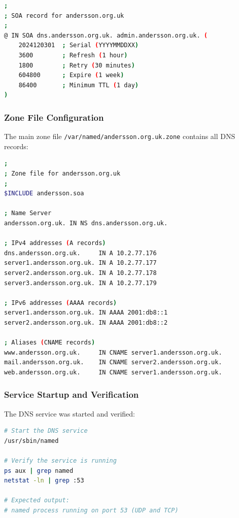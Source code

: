 \documentclass[12pt,a4paper]{article}
\begin{document}
\begin{lstlisting}[language=bash, caption=SOA Record for andersson.org.uk]
;
; SOA record for andersson.org.uk
;
@ IN SOA dns.andersson.org.uk. admin.andersson.org.uk. (
    2024120301  ; Serial (YYYYMMDDXX)
    3600        ; Refresh (1 hour)
    1800        ; Retry (30 minutes)
    604800      ; Expire (1 week)
    86400       ; Minimum TTL (1 day)
)
\end{lstlisting}

\subsubsection{Zone File Configuration}
The main zone file \texttt{/var/named/andersson.org.uk.zone} contains all DNS records:

\begin{lstlisting}[language=bash, caption=Zone File for andersson.org.uk]
;
; Zone file for andersson.org.uk
;
$INCLUDE andersson.soa

; Name Server
andersson.org.uk. IN NS dns.andersson.org.uk.

; IPv4 addresses (A records)
dns.andersson.org.uk.     IN A 10.2.77.176
server1.andersson.org.uk. IN A 10.2.77.177
server2.andersson.org.uk. IN A 10.2.77.178
server3.andersson.org.uk. IN A 10.2.77.179

; IPv6 addresses (AAAA records)
server1.andersson.org.uk. IN AAAA 2001:db8::1
server2.andersson.org.uk. IN AAAA 2001:db8::2

; Aliases (CNAME records)
www.andersson.org.uk.     IN CNAME server1.andersson.org.uk.
mail.andersson.org.uk.    IN CNAME server2.andersson.org.uk.
web.andersson.org.uk.     IN CNAME server1.andersson.org.uk.
\end{lstlisting}

\subsubsection{Service Startup and Verification}
The DNS service was started and verified:

\begin{lstlisting}[language=bash, caption=Starting and Verifying DNS Service]
# Start the DNS service
/usr/sbin/named

# Verify the service is running
ps aux | grep named
netstat -ln | grep :53

# Expected output:
# named process running on port 53 (UDP and TCP)
\end{lstlisting}
\end{document}
